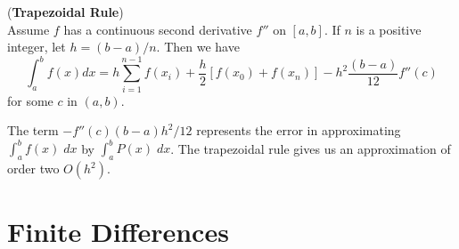 \documentclass[00main.tex]{subfiles}
\begin{document}
\begin{theorem} (\textbf{Trapezoidal Rule})\\
Assume $f$ has a continuous second derivative $f''$ on $[a,b]$. If $n$ is a positive integer, let $h = (b-a)/n$. Then we have \begin{equation}
\int _a^b f(x) dx = h \sum_{i=1}^{n-1} f( x_i) + \frac{h}{2} \left[ f(x_0) + f(x_n) \right] - h^2 \frac{(b-a)}{12} f''(c)\label{trapezoid}
\end{equation} for some $c$ in $(a,b)$.
\end{theorem}

The term $-f''(c) (b-a) h^2/12$ represents the error in approximating $\int_a^b f(x) \; dx$ by $\int_a^b P(x) \; dx$. The trapezoidal rule gives us an approximation of order two $O(h^2)$. %






\section{Finite Differences}
\end{document}
